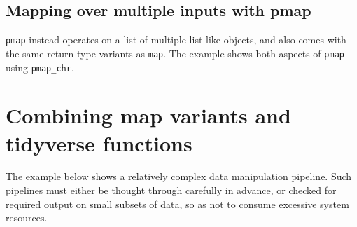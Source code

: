 \documentclass[]{book}
\newenvironment{Shaded}{}{}
\newcommand{\CommentTok}[1]{\textcolor[rgb]{0.38,0.63,0.69}{\textit{#1}}}
\newcommand{\ControlFlowTok}[1]{\textcolor[rgb]{0.00,0.44,0.13}{\textbf{#1}}}
\newcommand{\DecValTok}[1]{\textcolor[rgb]{0.25,0.63,0.44}{#1}}
\newcommand{\KeywordTok}[1]{\textcolor[rgb]{0.00,0.44,0.13}{\textbf{#1}}}
\newcommand{\NormalTok}[1]{#1}
\newcommand{\OperatorTok}[1]{\textcolor[rgb]{0.40,0.40,0.40}{#1}}
\newcommand{\StringTok}[1]{\textcolor[rgb]{0.25,0.44,0.63}{#1}}
\begin{document}
\hypertarget{mapping-over-multiple-inputs-with-pmap}{%
\subsection{Mapping over multiple inputs with pmap}\label{mapping-over-multiple-inputs-with-pmap}}

\texttt{pmap} instead operates on a list of multiple list-like objects, and also comes with the same return type variants as \texttt{map}. The example shows both aspects of \texttt{pmap} using \texttt{pmap\_chr}.

\begin{Shaded}
\end{Shaded}

\hypertarget{combining-map-variants-and-tidyverse-functions}{%
\section{Combining map variants and tidyverse functions}\label{combining-map-variants-and-tidyverse-functions}}

The example below shows a relatively complex data manipulation pipeline.
Such pipelines must either be thought through carefully in advance, or checked for required output on small subsets of data, so as not to consume excessive system resources.
\end{document}
